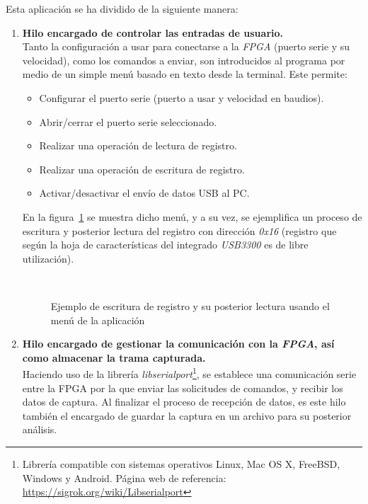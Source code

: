 Esta aplicación se ha dividido de la siguiente manera:
\begin{enumerate}
    \item \textbf{Hilo encargado de controlar las entradas de usuario.} \\
    Tanto la configuración a usar para conectarse a la \emph{FPGA} (puerto serie y su velocidad), como los comandos a enviar, son introducidos al programa por medio de un simple menú basado en texto desde la terminal. Este permite:
    \begin{itemize}
        \item Configurar el puerto serie (puerto a usar y velocidad en baudios).
        \item Abrir/cerrar el puerto serie seleccionado.
        \item Realizar una operación de lectura de registro.
        \item Realizar una operación de escritura de registro.
        \item Activar/desactivar el envío de datos USB al PC.
    \end{itemize}

    En la figura~\ref{fig:matriz-app-menu} se muestra dicho menú, y a su vez, se ejemplifica un proceso de escritura y posterior lectura del registro con dirección \emph{0x16} (registro que según la hoja de características del integrado \emph{USB3300}\cite{microchip:usb3300} es de libre utilización).

    \begin{figure}[htbp]
        \centering
         \\
        \caption{Ejemplo de escritura de registro y su posterior lectura usando el menú de la aplicación} 
        \label{fig:matriz-app-menu}
    \end{figure}
    
    \item \textbf{Hilo encargado de gestionar la comunicación con la \emph{FPGA}, así como almacenar la trama capturada.} \\
    Haciendo uso de la librería \emph{libserialport}\footnote{Librería compatible con sistemas operativos Linux, Mac OS X, FreeBSD, Windows y Android. Página web de referencia: \url{https://sigrok.org/wiki/Libserialport}}, se establece una comunicación serie entre la FPGA por la que enviar las solicitudes de comandos, y recibir los datos de captura. Al finalizar el proceso de recepción de datos, es este hilo también el encargado de guardar la captura en un archivo para su posterior análisis.



\end{enumerate}
